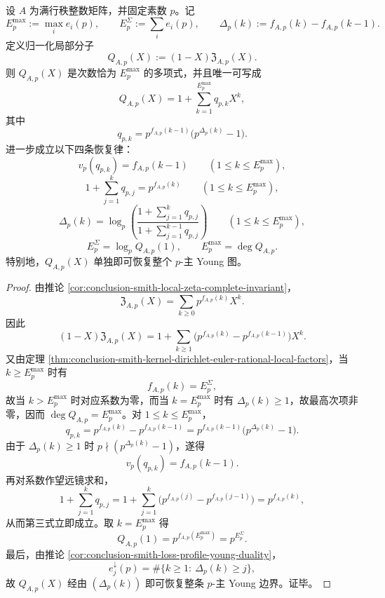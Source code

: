 \begin{theorem}\label{thm:conclusion-smith-normalized-local-numerator-newton-staircase}
设 \(A\) 为满行秩整数矩阵，并固定素数 \(p\)。记
\[
E_p^{\max}:=\max_i e_i(p),
\qquad
E_p^{\Sigma}:=\sum_i e_i(p),
\qquad
\Delta_p(k):=f_{A,p}(k)-f_{A,p}(k-1).
\]
定义归一化局部分子
\[
Q_{A,p}(X):=(1-X)\mathfrak Z_{A,p}(X).
\]
则 \(Q_{A,p}(X)\) 是次数恰为 \(E_p^{\max}\) 的多项式，并且唯一可写成
\[
Q_{A,p}(X)=1+\sum_{k=1}^{E_p^{\max}}q_{p,k}X^k,
\]
其中
\[
q_{p,k}=p^{f_{A,p}(k-1)}\bigl(p^{\Delta_p(k)}-1\bigr).
\]
进一步成立以下四条恢复律：
\[
v_p(q_{p,k})=f_{A,p}(k-1)
\qquad(1\le k\le E_p^{\max}),
\]
\[
1+\sum_{j=1}^{k}q_{p,j}=p^{f_{A,p}(k)}
\qquad(1\le k\le E_p^{\max}),
\]
\[
\Delta_p(k)=
\log_p\!\left(
\frac{1+\sum_{j=1}^{k}q_{p,j}}
{1+\sum_{j=1}^{k-1}q_{p,j}}
\right)
\qquad(1\le k\le E_p^{\max}),
\]
\[
E_p^{\Sigma}=\log_p Q_{A,p}(1),
\qquad
E_p^{\max}=\deg Q_{A,p}.
\]
特别地，\(Q_{A,p}(X)\) 单独即可恢复整个 \(p\)-主 Young 图。
\end{theorem}
\begin{proof}
由推论 \ref{cor:conclusion-smith-local-zeta-complete-invariant}，
\[
\mathfrak Z_{A,p}(X)=\sum_{k\ge 0}p^{f_{A,p}(k)}X^k.
\]
因此
\[
(1-X)\mathfrak Z_{A,p}(X)
=
1+\sum_{k\ge 1}\bigl(p^{f_{A,p}(k)}-p^{f_{A,p}(k-1)}\bigr)X^k.
\]
又由定理 \ref{thm:conclusion-smith-kernel-dirichlet-euler-rational-local-factors}，当 \(k\ge E_p^{\max}\) 时有
\[
f_{A,p}(k)=E_p^{\Sigma},
\]
故当 \(k>E_p^{\max}\) 时对应系数为零，而当 \(k=E_p^{\max}\) 时有 \(\Delta_p(k)\ge 1\)，故最高次项非零，因而 \(\deg Q_{A,p}=E_p^{\max}\)。对 \(1\le k\le E_p^{\max}\)，
\[
q_{p,k}
=
p^{f_{A,p}(k)}-p^{f_{A,p}(k-1)}
=
p^{f_{A,p}(k-1)}\bigl(p^{\Delta_p(k)}-1\bigr).
\]
由于 \(\Delta_p(k)\ge 1\) 时 \(p\nmid (p^{\Delta_p(k)}-1)\)，遂得
\[
v_p(q_{p,k})=f_{A,p}(k-1).
\]
再对系数作望远镜求和，
\[
1+\sum_{j=1}^{k}q_{p,j}
=
1+\sum_{j=1}^{k}\bigl(p^{f_{A,p}(j)}-p^{f_{A,p}(j-1)}\bigr)
=
p^{f_{A,p}(k)},
\]
从而第三式立即成立。取 \(k=E_p^{\max}\) 得
\[
Q_{A,p}(1)=p^{f_{A,p}(E_p^{\max})}=p^{E_p^{\Sigma}}.
\]
最后，由推论 \ref{cor:conclusion-smith-loss-profile-young-duality}，
\[
e_j^\downarrow(p)=\#\{k\ge 1:\ \Delta_p(k)\ge j\},
\]
故 \(Q_{A,p}(X)\) 经由 \((\Delta_p(k))\) 即可恢复整条 \(p\)-主 Young 边界。证毕。
\end{proof}

